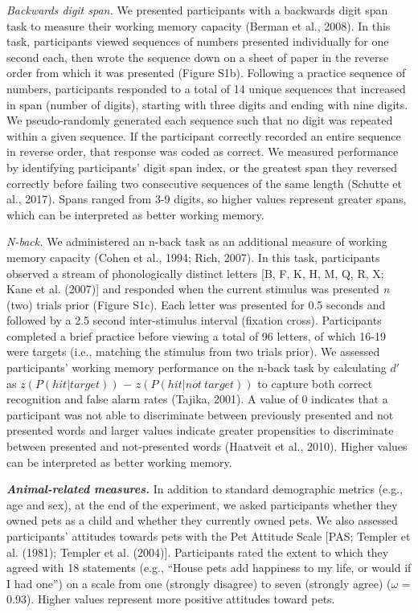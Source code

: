 \documentclass[
  english,
  pub,floatsintext]{apa6}
\begin{document}
\emph{Backwards digit span.}
We presented participants with a backwards digit span task to measure their working memory capacity (Berman et al., 2008). In this task, participants viewed sequences of numbers presented individually for one second each, then wrote the sequence down on a sheet of paper in the reverse order from which it was presented (Figure S1b). Following a practice sequence of numbers, participants responded to a total of 14 unique sequences that increased in span (number of digits), starting with three digits and ending with nine digits. We pseudo-randomly generated each sequence such that no digit was repeated within a given sequence. If the participant correctly recorded an entire sequence in reverse order, that response was coded as correct. We measured performance by identifying participants' digit span index, or the greatest span they reversed correctly before failing two consecutive sequences of the same length (Schutte et al., 2017). Spans ranged from 3-9 digits, so higher values represent greater spans, which can be interpreted as better working memory.

\emph{N-back.}
We administered an n-back task as an additional measure of working memory capacity (Cohen et al., 1994; Rich, 2007). In this task, participants observed a stream of phonologically distinct letters {[}B, F, K, H, M, Q, R, X; Kane et al. (2007){]} and responded when the current stimulus was presented \emph{n} (two) trials prior (Figure S1c). Each letter was presented for 0.5 seconds and followed by a 2.5 second inter-stimulus interval (fixation cross). Participants completed a brief practice before viewing a total of 96 letters, of which 16-19 were targets (i.e., matching the stimulus from two trials prior). We assessed participants' working memory performance on the n-back task by calculating \(d'\) as \(z(P(hit|target))\) \(-\) \(z(P(hit|not\ target))\) to capture both correct recognition and false alarm rates (Tajika, 2001). A value of 0 indicates that a participant was not able to discriminate between previously presented and not presented words and larger values indicate greater propensities to discriminate between presented and not-presented words (Haatveit et al., 2010). Higher values can be interpreted as better working memory.

\textbf{\emph{Animal-related measures.}}
In addition to standard demographic metrics (e.g., age and sex), at the end of the experiment, we asked participants whether they owned pets as a child and whether they currently owned pets. We also assessed participants' attitudes towards pets with the Pet Attitude Scale {[}PAS; Templer et al. (1981); Templer et al. (2004){]}. Participants rated the extent to which they agreed with 18 statements (e.g., ``House pets add happiness to my life, or would if I had one'') on a scale from one (strongly disagree) to seven (strongly agree) (\(\omega\) = 0.93). Higher values represent more positive attitudes toward pets.
\end{document}
